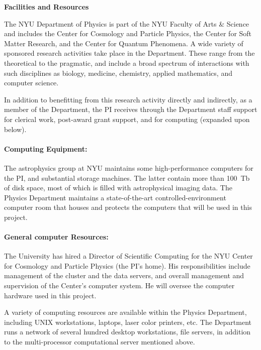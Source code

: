 \documentclass[12pt]{article}
\begin{document}
\sloppy\sloppypar\thispagestyle{empty}

\noindent
\textbf{Facilities and Resources}
\smallskip

The NYU Department of Physics is part of the NYU Faculty of Arts \&
Science and includes the Center for Cosmology and Particle Physics,
the Center for Soft Matter Research, and the Center for Quantum Phenomena.
A wide variety of sponsored
research activities take place in the Department.  These range from
the theoretical to the pragmatic, and include a broad spectrum of
interactions with such disciplines as biology, medicine, chemistry,
applied mathematics, and computer science.

In addition to benefitting from this research activity directly and
indirectly, as a member of the Department, the PI receives through the
Department staff support for clerical work, post-award grant support,
and for computing (expanded upon below).

\paragraph{Computing Equipment:}

The astrophysics group at NYU maintains some high-performance computers
for the PI, and substantial storage machines.
The latter contain more than 100~Tb of disk space, most of which is filled
with astrophysical imaging data.  The Physics Department maintains a
state-of-the-art controlled-environment computer room that houses and
protects the computers that will be used in this project.

\paragraph{General computer Resources:}

The University has hired a Director of Scientific Computing for the
NYU Center for Cosmology and Particle Physics (the PI's home).  His
responsibilities include management of the cluster and the data
servers, and overall management and supervision of the Center's
computer system.  He will oversee the computer hardware used in this
project.

A variety of computing resources are available within the Physics
Department, including UNIX workstations, laptops, laser color
printers, etc.  The Department runs a network of several hundred
desktop workstations, file servers, in addition to the multi-processor
computational server mentioned above.
\end{document}
